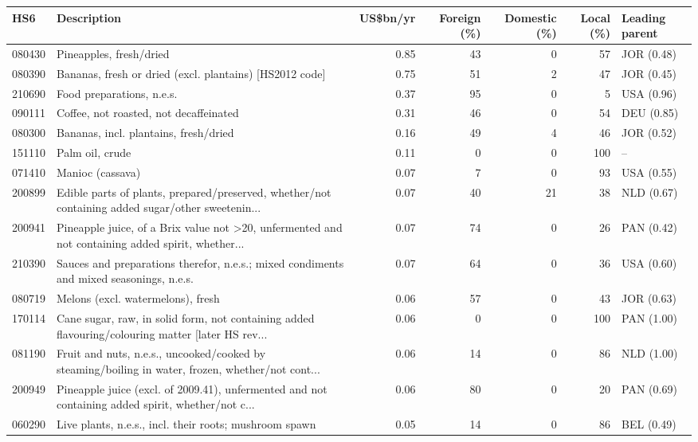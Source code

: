 \begin{tabular}{@{}l p{6.4cm} r r r r l@{}}
\toprule
HS6 & Description & US\$bn/yr & Foreign (\%) & Domestic (\%) & Local (\%) & Leading parent \\
\midrule
080430 & Pineapples, fresh/\allowbreak{}dried & 0.85 & 43 & 0 & 57 & JOR (0.48) \\
080390 & Bananas, fresh or dried (excl. plantains) [HS2012 code] & 0.75 & 51 & 2 & 47 & JOR (0.45) \\
210690 & Food preparations, n.e.s. & 0.37 & 95 & 0 & 5 & USA (0.96) \\
090111 & Coffee, not roasted, not decaffeinated & 0.31 & 46 & 0 & 54 & DEU (0.85) \\
080300 & Bananas, incl. plantains, fresh/\allowbreak{}dried & 0.16 & 49 & 4 & 46 & JOR (0.52) \\
151110 & Palm oil, crude & 0.11 & 0 & 0 & 100 & -- \\
071410 & Manioc (cassava) & 0.07 & 7 & 0 & 93 & USA (0.55) \\
200899 & Edible parts of plants, prepared/\allowbreak{}preserved, whether/\allowbreak{}not containing added sugar/\allowbreak{}other sweetenin... & 0.07 & 40 & 21 & 38 & NLD (0.67) \\
200941 & Pineapple juice, of a Brix value not >20, unfermented and not containing added spirit, whether... & 0.07 & 74 & 0 & 26 & PAN (0.42) \\
210390 & Sauces and preparations therefor, n.e.s.; mixed condiments and mixed seasonings, n.e.s. & 0.07 & 64 & 0 & 36 & USA (0.60) \\
080719 & Melons (excl. watermelons), fresh & 0.06 & 57 & 0 & 43 & JOR (0.63) \\
170114 & Cane sugar, raw, in solid form, not containing added flavouring/\allowbreak{}colouring matter [later HS rev... & 0.06 & 0 & 0 & 100 & PAN (1.00) \\
081190 & Fruit and nuts, n.e.s., uncooked/\allowbreak{}cooked by steaming/\allowbreak{}boiling in water, frozen, whether/\allowbreak{}not cont... & 0.06 & 14 & 0 & 86 & NLD (1.00) \\
200949 & Pineapple juice (excl. of 2009.41), unfermented and not containing added spirit, whether/\allowbreak{}not c... & 0.06 & 80 & 0 & 20 & PAN (0.69) \\
060290 & Live plants, n.e.s., incl. their roots; mushroom spawn & 0.05 & 14 & 0 & 86 & BEL (0.49) \\
\bottomrule
\end{tabular}
